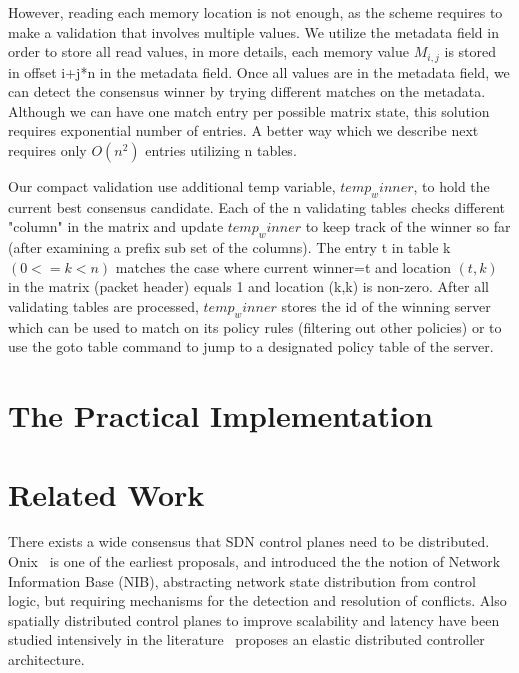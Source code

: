 \documentclass[conference]{sigcomm-alternate}
\begin{document}
However, reading each memory location is not enough, as the scheme requires to make a validation that involves multiple values. We utilize the metadata field in order to store all read values, in more details, each memory value $M_{i,j}$ is stored in offset i+j*n in the metadata field. Once all values are in the metadata field, we can detect the consensus winner by trying different matches on the metadata. Although we can have one match entry per possible matrix state, this solution requires exponential number of entries. A better way which we describe next requires only $O(n^2)$ entries utilizing n tables.

Our compact validation use additional temp variable, $temp_winner$, to hold the current best consensus candidate. Each of the n validating tables checks different "column" in the matrix and update $temp_winner$ to keep track of the winner so far (after examining a prefix sub set of the columns). The entry t in table k $(0<=k<n)$  matches the case where current winner=t and location $(t,k)$ in the matrix (packet header) equals 1 and location (k,k) is non-zero. After all validating tables are processed, $temp_winner$ stores the id of the winning server which can be used to match on its policy rules (filtering out other policies) or to use the goto table command to jump to a designated policy table of the server.


\section{The Practical Implementation}\label{sec:extension}



\section{Related Work}\label{sec:relwork}

There exists a wide consensus that SDN control planes need to be distributed.~\cite{onos,onix,elasticon} 
Onix~\cite{onix} is one of the earliest proposals, and introduced the 
the notion of Network Information Base (NIB), abstracting network state
distribution from control logic, but 
requiring mechanisms for the detection and resolution of conflicts. 
Also spatially distributed control planes to improve scalability and
latency have been studied intensively
in the literature~\cite{kandoo,ctrl-place,hotsdn13loc}
proposes an elastic distributed controller architecture. 
\end{document}
